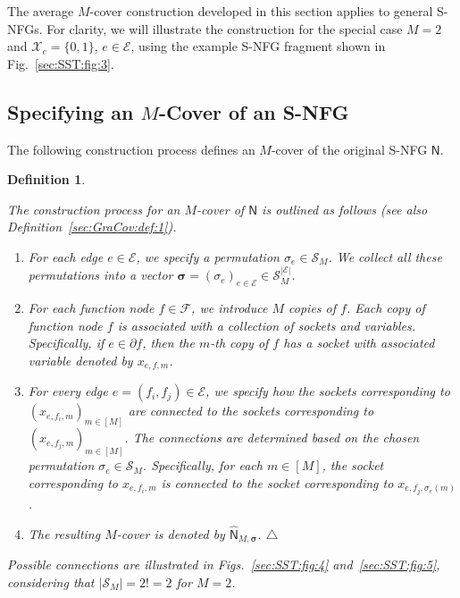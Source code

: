\documentclass[journal]{IEEEtran}
\newcommand{\add}[1]{{\color{black}#1}}
\newtheorem{definition}[theorem]{Definition}
\newcommand{\manualendsymbol}[1]{%
  \leavevmode\unskip\penalty9999\hbox{}\nobreak\hfill
  \quad\hbox{#1}}
\newcommand{\edefinition}{\manualendsymbol{\ensuremath{\triangle}}}
\newcommand{\vect}[1]{ \bm{#1} }
\newcommand{\set}[1]{\mathcal{#1}}
\newcommand{\setEfull}{ \mathcal{E} }
\newcommand{\setpf}{ \partial f }
\newcommand{\graphN}{ \mathsf{N} }
\newcommand{\hgraphN}{ \hat{\graphN} }
\newcommand{\vsigma}{\vect{\sigma}}
\newcommand{\efi}{ e,f_i }
\newcommand{\efj}{ e,f_j }
\begin{document}


\add{The average $M$-cover construction developed in this section applies to
  general S-NFGs. For clarity, we will illustrate the construction for the
  special case $M = 2$ and $\set{X}_e = \{ 0, 1 \}$, $e \in \setEfull$, using
  the example S-NFG fragment shown in Fig.~\ref{sec:SST:fig:3}.}

\subsection{Specifying an \texorpdfstring{$M$}{}-Cover of an S-NFG}

The following construction process defines an $M$-cover of the original S-NFG $\graphN$.

\begin{definition}
  \label{def:graph:cover:construction:1}

  The construction process for an $M$-cover of $\graphN$ is outlined as follows (see also
  Definition~\ref{sec:GraCov:def:1}).
  \begin{enumerate}

    \item For each edge $e \in \setEfull$, we specify a permutation
          $\sigma_e \in \set{S}_M$. We collect all these permutations into a vector $\vsigma = (\sigma_e)_{e \in \setEfull} \in \set{S}_M^{|\setEfull|}$.

    \item\label{def:graph:cover:construction:1:item:1} For each function node $f \in \set{F}$, we introduce $M$ copies of $f$. Each copy
          of function node $f$ is associated with a collection of sockets and variables. Specifically,
          if $e \in \setpf$, then the $m$-th copy of $f$ has a socket with
          associated variable denoted by $x_{e,f,m}$.

    \item For every edge $e = (f_i, f_{j}) \in \setEfull$, we specify how the
          sockets corresponding to $(x_{\efi,m})_{m \in [M]}$ are connected to the
          sockets corresponding to $(x_{\efj,m})_{m \in [M]}$.
          \add{The connections are determined} based on the chosen permutation $\sigma_e \in \set{S}_M$. Specifically, for each $m \in [M]$, the socket corresponding to $x_{\efi,m}$ is connected to the socket corresponding to $x_{\efj,\sigma_{e}(m)}$.

    \item The resulting $M$-cover is denoted by $\hgraphN_{M,\vsigma}$.
          \edefinition
  \end{enumerate}
  \add{Possible connections are illustrated} in Figs.~\ref{sec:SST:fig:4} and~\ref{sec:SST:fig:5}, considering that $|\set{S}_M| = 2! = 2$ for $M = 2$.
\end{definition}
\end{document}
